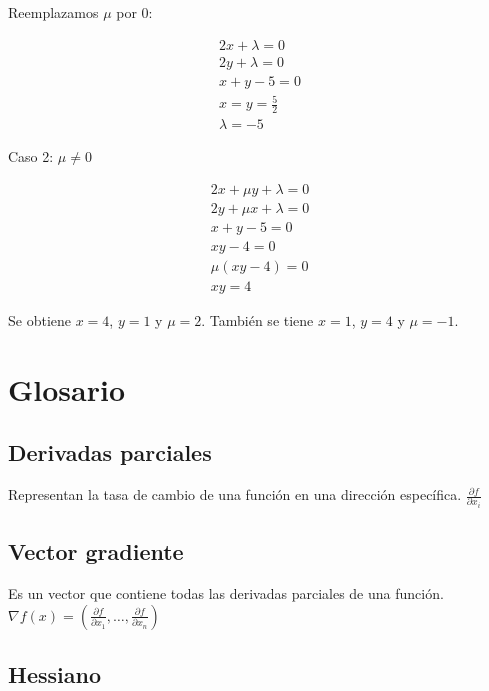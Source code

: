 \documentclass{article}
\newenvironment{solution}
{\begin{mdframed}[backgroundcolor=lightorange,hidealllines=true]}
{\end{mdframed}}
\begin{document}
\begin{solution}
    Reemplazamos $\mu$ por $0$:

    \begin{align*}
        2x + \lambda = 0 \\
        2y + \lambda = 0 \\
        x + y - 5 = 0    \\
        x=y= \frac{5}{2} \\
        \lambda = -5
    \end{align*}

    Caso 2: $\mu \neq 0$

    \begin{align*}
        2x + \mu y + \lambda = 0 \\
        2y + \mu x + \lambda = 0 \\
        x + y - 5 = 0            \\
        xy - 4 = 0               \\
        \mu(xy-4) = 0            \\
        xy = 4
    \end{align*}

    Se obtiene $x=4$, $y=1$ y $\mu = 2$. También se tiene $x=1$, $y=4$ y $\mu = -1$.

\end{solution}

\section{Glosario}

\subsection*{Derivadas parciales}

Representan la tasa de cambio de una función en una dirección específica. $\frac{\partial f}{\partial x_i}$

\subsection*{Vector gradiente}

Es un vector que contiene todas las derivadas parciales de una función. $\nabla f(x) = \left( \frac{\partial f}{\partial x_1}, \ldots, \frac{\partial f}{\partial x_n} \right)$

\subsection*{Hessiano}
\end{document}
